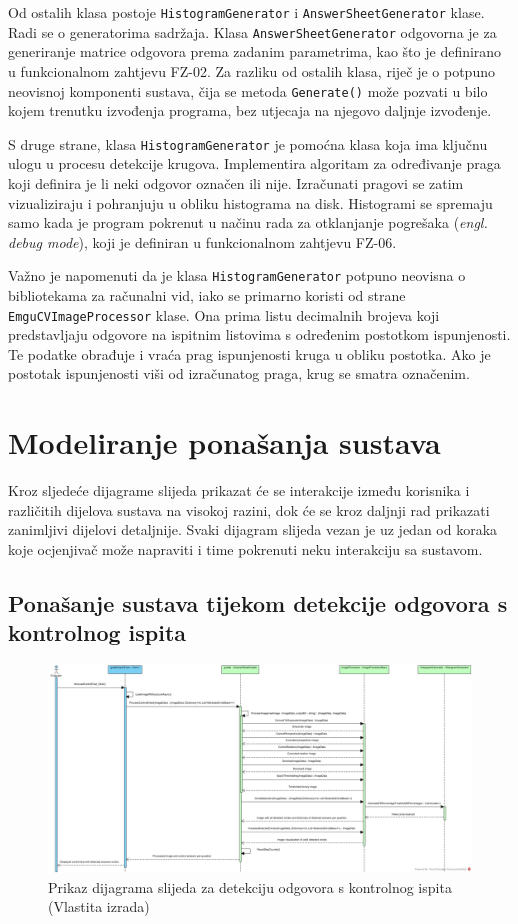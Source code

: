 \documentclass{foi}
\begin{document}
Od ostalih klasa postoje \texttt{HistogramGenerator} i \texttt{AnswerSheetGenerator} klase. Radi se o generatorima sadržaja. Klasa \texttt{AnswerSheetGenerator} odgovorna je za generiranje matrice odgovora prema zadanim parametrima, kao što je definirano u funkcionalnom zahtjevu FZ-02. Za razliku od ostalih klasa, riječ je o potpuno neovisnoj komponenti sustava, čija se metoda \texttt{Generate()} može pozvati u bilo kojem trenutku izvođenja programa, bez utjecaja na njegovo daljnje izvođenje.

S druge strane, klasa \texttt{HistogramGenerator} je pomoćna klasa koja ima ključnu ulogu u procesu detekcije krugova. Implementira algoritam za određivanje praga koji definira je li neki odgovor označen ili nije. Izračunati pragovi se zatim  vizualiziraju i pohranjuju u obliku histograma na disk. Histogrami se spremaju samo kada je program pokrenut u načinu rada za otklanjanje pogrešaka (\textit{engl. debug mode}), koji je definiran u funkcionalnom zahtjevu FZ-06.

Važno je napomenuti da je klasa \texttt{HistogramGenerator} potpuno neovisna o bibliotekama za računalni vid, iako se primarno koristi od strane \texttt{EmguCVImageProcessor} klase. Ona prima listu decimalnih brojeva koji predstavljaju odgovore na ispitnim listovima s određenim postotkom ispunjenosti. Te podatke obrađuje i vraća prag ispunjenosti kruga u obliku postotka. Ako je postotak ispunjenosti viši od izračunatog praga, krug se smatra označenim.

\section{Modeliranje ponašanja sustava}

Kroz sljedeće dijagrame slijeda prikazat će se interakcije između korisnika i različitih dijelova sustava na visokoj razini, dok će se kroz daljnji rad prikazati zanimljivi dijelovi detaljnije. Svaki dijagram slijeda vezan je uz jedan od koraka koje ocjenjivač može napraviti i time pokrenuti neku interakciju sa sustavom.

\subsection{Ponašanje sustava tijekom detekcije odgovora s kontrolnog ispita}

\begin{figure}[H]
\centering
\includegraphics[width=1.0\linewidth]{slike/sequence1.jpg}
\caption{Prikaz dijagrama slijeda za detekciju odgovora s kontrolnog ispita (Vlastita izrada)}
\end{figure}
\end{document}
